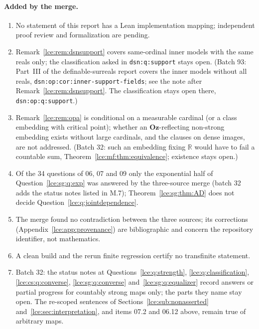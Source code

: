 \documentclass[11pt,letterpaper]{article}
\numberwithin{equation}{section}
\theoremstyle{definition}
\theoremstyle{remark}
\newcommand{\Oz}{\mathbf{Oz}}
\newcommand{\R}{\mathbb R}
\newcommand{\thref}[1]{Theorem~\ref{#1}}
\newcommand{\lbl}[1]{\nolinkurl{#1}}%
\begin{document}
\paragraph{Added by the merge.}
\begin{enumerate}[label=M.\arabic*]
\item No statement of this report has a Lean implementation mapping;
independent proof review and formalization are pending.
\item Remark~\ref{lce:rem:dsnsupport} covers same-ordinal inner models with
the same reals only; the classification asked in \lbl{dsn:q:support} stays
open. (Batch 93: Part~III of the definable-surreals report covers the inner
models without all reals, \lbl{dsn:op:cor:inner-support-fields}; see the note
after Remark~\ref{lce:rem:dsnsupport}. The classification stays open there,
\lbl{dsn:op:q:support}.)
\item Remark~\ref{lce:rem:opa} is conditional on a measurable cardinal (or a
class embedding with critical point); whether an $\Oz$-reflecting non-strong
embedding exists without large cardinals, and the clauses on dense images,
are not addressed. (Batch 32: such an embedding fixing $\R$ would have to
fail a countable sum, \thref{lce:mf:thm:equivalence}; existence stays
open.)
\item Of the 34 questions of 06, 07 and 09 only the exponential half of
Question~\ref{lce:sg:q:exp} was answered by the three-source merge (batch 32
adds the status notes listed in M.7);
\thref{lce:sg:thm:AD} does not decide Question~\ref{lce:q:jointdependence}.
\item The merge found no contradiction between the three sources; its
corrections (Appendix~\ref{lce:app:provenance}) are bibliographic and
concern the repository identifier, not mathematics.
\item A clean build and the rerun finite regression certify no
transfinite statement.
\item Batch 32: the status notes at Questions~\ref{lce:q:strength},
\ref{lce:q:classification}, \ref{lce:cs:q:converse},
\ref{lce:sg:q:converse} and~\ref{lce:sg:q:equalizer} record answers or
partial progress for countably strong maps only; the parts they name stay
open. The re-scoped sentences of Sections~\ref{lce:sub:nonasserted}
and~\ref{lce:sec:interpretation}, and items 07.2 and 06.12 above, remain
true of arbitrary maps.
\end{enumerate}
\end{document}
